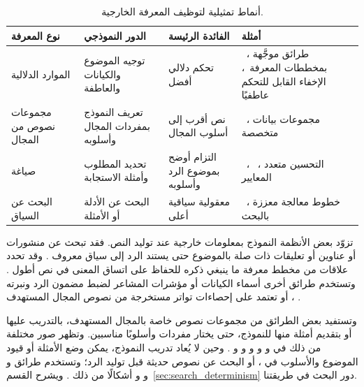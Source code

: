 \begin{table}[t]
  \centering
  \small
  \caption{أنماط تمثيلية لتوظيف المعرفة الخارجية.}
  \label{tab:knowledge_integration}
  \begin{RTL}
  \begin{tabular}{|A{3cm}|A{2.2cm}|A{3cm}|A{5.2cm}|}
    \hline
    \textbf{نوع المعرفة} & \textbf{الدور النموذجي}               & \textbf{الفائدة الرئيسة}       & \textbf{أمثلة}                                                                \\
    \hline
    الموارد الدلالية      & توجيه الموضوع والكيانات والعاطفة & تحكم دلالي أفضل        & ~\cite{liao2024co}، طرائق موجَّهة بمخططات المعرفة~\cite{li2024semantic,ding2023joint}، الإخفاء القابل للتحكم عاطفيًا~\cite{shi2025emotionally} \\
    \hline
    مجموعات نصوص من المجال          & تعريف النموذج بمفردات المجال وأسلوبه                   & نص أقرب إلى أسلوب المجال           & ~\cite{pang2024fremax}، مجموعات بيانات متخصصة                                                     \\
    \hline
    صياغة       & تحديد المطلوب وأمثلة الاستجابة                  & التزام أوضح بموضوع الرد وأسلوبه          & ~\cite{lin2024zero}، ~\cite{kuznetsov2025deepstego}، التحسين متعدد المعايير~\cite{wozniak2025multicriteria}                                \\
    \hline
    البحث عن السياق       & البحث عن الأدلة أو الأمثلة       & معقولية سياقية أعلى & ~\cite{liao2024co}، خطوط معالجة معززة بالبحث~\cite{wang2023hi}                                          \\
    \hline
  \end{tabular}
  \end{RTL}
\end{table}

تزوّد بعض الأنظمة النموذج بمعلومات خارجية عند توليد النص. فقد تبحث عن منشورات أو عناوين أو تعليقات ذات صلة بالموضوع حتى يستند الرد إلى سياق معروف \cite{wang2023hi}. وقد تحدد علاقات من مخطط معرفة ما ينبغي ذكره للحفاظ على اتساق المعنى في نص أطول \cite{li2024semantic}. وتستخدم طرائق أخرى أسماء الكيانات أو مؤشرات المشاعر لضبط مضمون الرد ونبرته \cite{shi2025emotionally}، أو تعتمد على إحصاءات تواتر مستخرجة من نصوص المجال المستهدف \cite{pang2024fremax}.

وتستفيد بعض الطرائق من مجموعات نصوص خاصة بالمجال المستهدف، بالتدريب عليها أو بتقديم أمثلة منها للنموذج، حتى يختار مفردات وأسلوبًا مناسبين. وتظهر صور مختلفة من ذلك في  و و و و و \cite{yang2020vae,kaptchuk2021meteor,wang2023hi,pang2024fremax,li2023rewriting,zhang2024controllable}. وحين لا يُعاد تدريب النموذج، يمكن وضع الأمثلة أو قيود الموضوع والأسلوب في ، أو البحث عن نصوص حديثة قبل توليد الرد؛ وتستخدم طرائق  و و و أشكالًا من ذلك \cite{lin2024zero,wu2024generative,kuznetsov2025deepstego,wozniak2025multicriteria,liao2024co}. ويشرح القسم~\ref{sec:search_determinism} دور البحث في طريقتنا.

